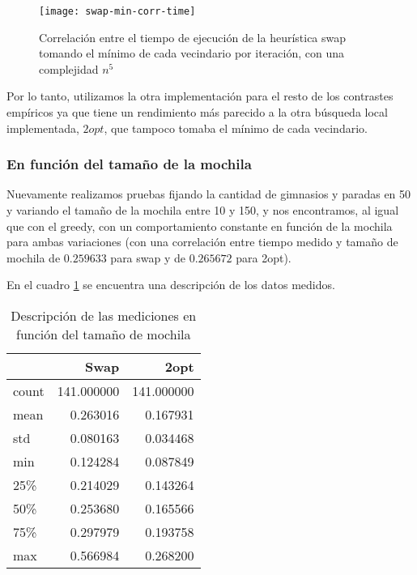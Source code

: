 \begin{figure}[H]
    \centering
    \texttt{[image: swap-min-corr-time]}
    \caption{Correlación entre el tiempo de ejecución de la heurística swap tomando el mínimo de cada vecindario por iteración, con una complejidad $n^5$}
    \label{fig:time-local-swap_min-correlation}
\end{figure}

Por lo tanto, utilizamos la otra implementación para el resto de los contrastes empíricos ya que tiene un rendimiento más parecido a la otra búsqueda local implementada, $2opt$, que tampoco tomaba el mínimo de cada vecindario.

\subsubsection{En función del tamaño de la mochila}

Nuevamente realizamos pruebas fijando la cantidad de gimnasios y paradas en 50 y variando el tamaño de la mochila entre 10 y 150, y nos encontramos, al igual que con el greedy, con un comportamiento constante en función de la mochila para ambas variaciones (con una correlación entre tiempo medido y tamaño de mochila de $0.259633$ para swap y de $0.265672$ para 2opt).

En el cuadro \ref{tab:time-local-moch} se encuentra una descripción de los datos medidos.

\begin{table}[H]
    \begin{center}
        \begin{tabular}{ l | r r }
            & Swap & 2opt \\
            \hline
            count  & 141.000000 & 141.000000 \\
            mean   &   0.263016 &   0.167931 \\
            std    &   0.080163 &   0.034468 \\
            min    &   0.124284 &   0.087849 \\
            25\%   &   0.214029 &   0.143264 \\
            50\%   &   0.253680 &   0.165566 \\
            75\%   &   0.297979 &   0.193758 \\
            max    &   0.566984 &   0.268200 \\
        \end{tabular}
        \caption{Descripción de las mediciones en función del tamaño de mochila}\label{tab:time-local-moch}
    \end{center}
\end{table}

